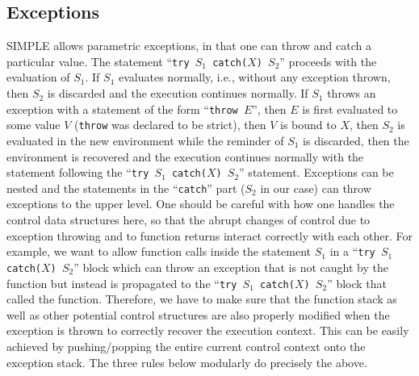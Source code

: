\documentclass{article}
\begin{document}
\begin{kdefinition}
\begin{module}{}
\begin{kblock}[text]
 \subsection{Exceptions}
SIMPLE allows parametric exceptions, in that one can throw and catch a
particular value.  The statement ``\texttt{try $S_1$ catch($X$) $S_2$}''
proceeds with the evaluation of $S_1$.  If $S_1$ evaluates normally, i.e.,
without any exception thrown, then $S_2$ is discarded and the execution
continues normally.  If $S_1$ throws an exception with a statement of the
form ``\texttt{throw $E$}'', then $E$ is first evaluated to some value $V$
(\texttt{throw} was declared to be strict), then $V$ is bound to $X$, then
$S_2$ is evaluated in the new environment while the reminder of $S_1$ is
discarded, then the environment is recovered and the execution continues
normally with the statement following the ``\texttt{try $S_1$ catch($X$)
$S_2$}'' statement.  Exceptions can be nested and the statements in the
``\texttt{catch}'' part ($S_2$ in our case) can throw exceptions to the
upper level.  One should be careful with how one handles the control data
structures here, so that the abrupt changes of control due to exception
throwing and to function returns interact correctly with each other.
For example, we want to allow function calls inside the statement $S_1$ in
a ``\texttt{try $S_1$ catch($X$) $S_2$}'' block which can throw an exception
that is not caught by the function but instead is propagated to the
``\texttt{try $S_1$ catch($X$) $S_2$}'' block that called the function.
Therefore, we have to make sure that the function stack as well as other
potential control structures are also properly modified when the exception
is thrown to correctly recover the execution context.  This can be easily
achieved by pushing/popping the entire current control context onto the
exception stack.  The three rules below modularly do precisely the above. \end{kblock}

\begin{syntaxBlock}{}
\end{syntaxBlock}


\end{module}
\end{kdefinition}
\end{document}
